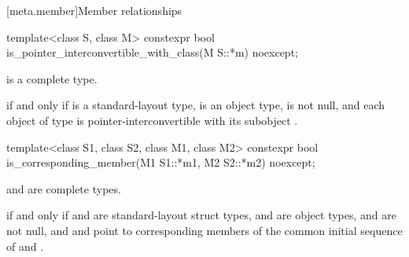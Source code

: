 [meta.member]{Member relationships}

\begin{itemdecl}
template<class S, class M>
  constexpr bool is_pointer_interconvertible_with_class(M S::*m) noexcept;
\end{itemdecl}

\begin{itemdescr}
\pnum
\mandates
{} is a complete type.

\pnum
\returns
{} if and only if
  is a standard-layout type,
  is an object type,
  is not null,
 and each object  of type 
 is pointer-interconvertible
 with its subobject .
\end{itemdescr}

\begin{itemdecl}
template<class S1, class S2, class M1, class M2>
  constexpr bool is_corresponding_member(M1 S1::*m1, M2 S2::*m2) noexcept;
\end{itemdecl}

\begin{itemdescr}
\pnum
\mandates
{} and  are complete types.

\pnum
\returns
{} if and only if
  and  are standard-layout struct types,
  and  are object types,
  and  are not null,
 and  and  point to corresponding members of
 the common initial sequence of  and .
\end{itemdescr}

